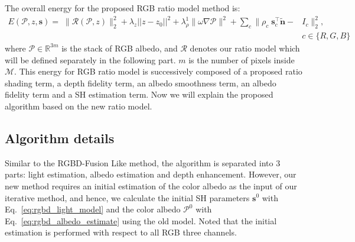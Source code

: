 The overall energy for the proposed RGB ratio model method is:
\begin{equation}\label{eq:ratio_energy}
    \begin{split}
    E(\mathcal{P}, z, \mathbf{s}) = \; \lVert \mathscr{R}(\mathcal{P}, z) \rVert^2_2 
    + \lambda_z||z - z_0||^2
    + \lambda_{\rho}^1 \lVert \omega \nabla \mathcal{P} \rVert^2
    + \sum_{c} \lVert \rho_c \; \mathbf{s}_c^\top \tilde{\mathbf{n}} - &I_c \rVert^2_2, \; \\ &c\in\{R,G,B\}
    \end{split}
\end{equation}
where $\mathcal{P}\in\mathbb{R}^{3m}$ is the stack of RGB albedo, and $\mathscr{R}$ denotes our ratio model which will be defined separately in the following part. $m$ is the number of pixels inside $\mathcal{M}$.
This energy for RGB ratio model is successively composed of a proposed ratio shading term, a depth fidelity term, an albedo smoothness term, an albedo fidelity term and a SH estimation term.
Now we will explain the proposed algorithm based on the new ratio model.


\subsection{Algorithm details}
Similar to the RGBD-Fusion Like method, the algorithm is separated into 3 parts: light estimation, albedo estimation and depth enhancement.
However, our new method requires an initial estimation of the color albedo as the input of our iterative method, and hence, we calculate the initial SH parameters $\mathbf{s}^{0}$ with Eq.~\ref{eq:rgbd_light_model} and the color albedo $\mathcal{P}^{0}$ with Eq.~\ref{eq:rgbd_albedo_estimate} using the old model.
Noted that the initial estimation is performed with respect to all RGB three channels.

